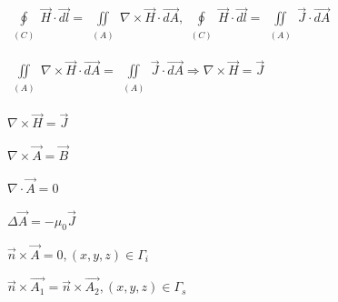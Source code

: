 $\oint\limits_{\begin{array}{c}(C)\\\end{array}}\vec{H}\cdot\overrightarrow{dl}=\iint\limits_{\begin{array}{c}(A)\\\end{array}}\nabla\times\vec{H}\cdot\overrightarrow{dA},\oint\limits_{\begin{array}{c}(C)\\\end{array}}\vec{H}\cdot\overrightarrow{dl}=\iint\limits_{\begin{array}{c}(A)\\\end{array}}\vec{J}\cdot\overrightarrow{dA}$

$\iint\limits_{\begin{array}{c}(A)\\\end{array}}\nabla\times\vec{H}\cdot\overrightarrow{dA}=\iint\limits_{\begin{array}{c}(A)\\\end{array}}\vec{J}\cdot\overrightarrow{dA}\Rightarrow\boxed{\nabla\times\vec{H}=\vec{J}}$

$\nabla\times\vec{H}=\vec{J}$

$\nabla\times\vec{A}=\vec{B}$

$\nabla\cdot\vec{A}=0$

$\Delta\vec{A}=-\mu_0\vec{J}$

$\vec{n}\times\vec{A}=0,(x,y,z)\in\Gamma_i$

$\vec{n}\times\overrightarrow{A_1}=\vec{n}\times\overrightarrow{A_2},(x,y,z)\in\Gamma_s$

